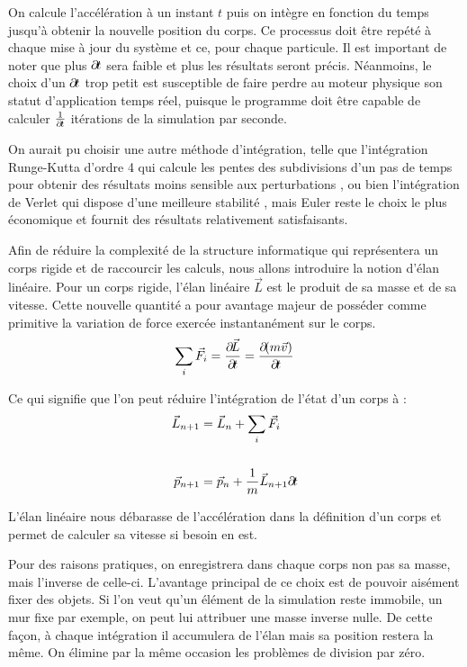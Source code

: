 On calcule l'accélération à un instant $t$ puis on intègre en fonction
du temps jusqu'à obtenir la nouvelle position du corps. Ce processus
doit être repété à chaque mise à jour du système et ce, pour chaque
particule. Il est important de noter que plus $\partial \! t$ sera faible
et plus les résultats seront précis. Néanmoins, le choix d'un $\partial \!
t$ trop petit est susceptible de faire perdre au moteur physique son
statut d'application temps réel, puisque le programme doit être
capable de calculer $\frac{1}{\partial \! t}$ itérations de la simulation
par seconde.

On aurait pu choisir une autre méthode d'intégration, telle que
l'intégration Runge-Kutta d'ordre 4 qui calcule les pentes des
subdivisions d'un pas de temps pour obtenir des résultats moins
sensible aux perturbations \cite{fiedler}, ou bien l'intégration de
Verlet qui dispose d'une meilleure stabilité \cite{bitterli}, mais
Euler reste le choix le plus économique et fournit des résultats
relativement satisfaisants.

Afin de réduire la complexité de la structure informatique qui
représentera un corps rigide et de raccourcir les calculs, nous allons
introduire la notion d'élan linéaire. Pour un corps rigide, l'élan
linéaire $\vec{L}$ est le produit de sa masse et de sa vitesse. Cette
nouvelle quantité a pour avantage majeur de posséder comme primitive
la variation de force exercée instantanément sur le corps.
\begin{align*}
  \sum_i \vec{F}_i = \frac{\partial \! \vec{L}}{\partial \! t} = \frac{\partial \! (m\vec{v})}{\partial \! t}
\end{align*}

Ce qui signifie que l'on peut réduire l'intégration de l'état d'un
corps à :
\begin{align*}
  \vec{L}_{n+1} &= \vec{L}_n + {\sum_i \vec{F}_i} \\ \\
  \vec{p}_{n+1} &= \vec{p}_n + \frac{1}{m}\vec{L}_{n+1} \partial \! t
\end{align*}

L'élan linéaire nous débarasse de l'accélération dans la définition
d'un corps et permet de calculer sa vitesse si besoin en est.

Pour des raisons pratiques, on enregistrera dans chaque corps non pas
sa masse, mais l'inverse de celle-ci. L'avantage principal de ce choix
est de pouvoir aisément fixer des objets. Si l'on veut qu'un élément
de la simulation reste immobile, un mur fixe par exemple, on peut lui
attribuer une masse inverse nulle. De cette façon, à chaque
intégration il accumulera de l'élan mais sa position restera la
même. On élimine par la même occasion les problèmes de division par
zéro.

